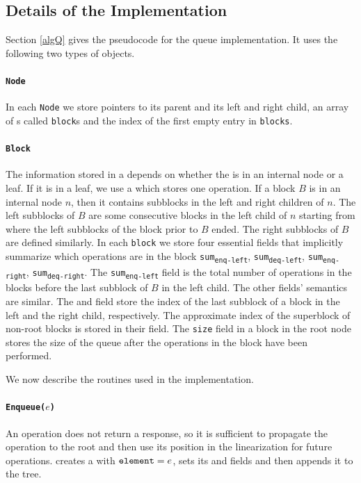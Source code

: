 \subsection{Details of the Implementation}
Section \ref{algQ} gives the pseudocode for the queue
implementation. It uses the following two types of objects. 
\paragraph{\tt{Node}} 
 In each \texttt{Node} we store pointers to its parent and its left
 and right child, an array of s called \texttt{block}s and
 the index  of the first empty entry in \texttt{blocks}. 

\paragraph{\tt{Block}}
 The information stored in a  depends on whether  the
  is in an internal node or a leaf. If it is in a leaf, we
 use a  which stores one operation. If a block $B$ is in
 an internal node $n$, then it contains subblocks in the left and
 right children of $n$. The left subblocks of $B$ are some consecutive
 blocks in the left child of $n$ starting from where the left
 subblocks of the block prior to $B$ ended. The right subblocks of $B$
 are defined similarly. In each \texttt{block} we store four essential
 fields that implicitly summarize which operations are in the block
 \texttt{sum\textsubscript{enq-left}},
 \texttt{sum\textsubscript{deq-left}},
 \texttt{sum\textsubscript{enq-right}},
 \texttt{sum\textsubscript{deq-right}}. The
 \texttt{sum\textsubscript{enq-left}} field is the total number of
  operations in the blocks before the last subblock of $B$
 in the left child. The other fields' semantics are similar. The
  and  field store the index of
 the last subblock of a block in the left and the right child,
 respectively. The approximate index of the superblock of non-root
 blocks is stored in their  field. The \texttt{size} field
 in a block in the root node stores the size of the queue after the
 operations in the block have been performed.  

We now describe the routines used in the implementation.

\paragraph{\tt{Enqueue($e$)}}
An  operation does not return a response, so it is
sufficient to propagate the  operation to the root and
then use its position in the linearization for future 
operations.  creates a  with
${\normalfont{\texttt{element}}}=e$, sets its  and 
fields and then appends it to the tree. 

